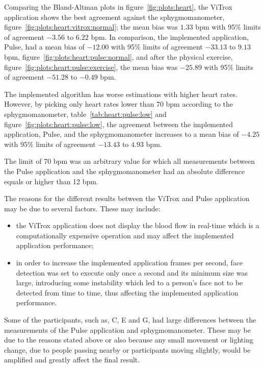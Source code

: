 \pagebreak

Comparing the Bland-Altman plots in figure~\ref{fig:plots:heart}, the ViTrox
application shows the best agreement against the sphygmomanometer,
figure~\ref{fig:plots:heart:vitrox:normal}; the mean bias was $1.33$ bpm
with 95\% limits of agreement $-3.56$ to $6.22$ bpm. In comparison,
the implemented application, Pulse, had a mean bias of $-12.00$ with
95\% limits of agreement $-33.13$ to $9.13$ bpm,
figure~\ref{fig:plots:heart:pulse:normal}, and after the physical exercise,
figure~\ref{fig:plots:heart:pulse:exercise}, the mean bias was $-25.89$
with 95\% limits of agreement $-51.28$ to $-0.49$ bpm.

The implemented algorithm has worse estimations with higher heart rates.
However, by picking only heart rates lower than 70 bpm according to the
sphygmomanometer, table~\ref{tab:heart:pulse:low} and
figure~\ref{fig:plots:heart:pulse:low}, the agreement between the
implemented application, Pulse, and the sphygmomanometer increases to
a mean bias of $-4.25$ with 95\% limits of agreement $-13.43$ to $4.93$ bpm.

The limit of 70 bpm was an arbitrary value for which all measurements
between the Pulse application and the sphygmomanometer had an absolute
difference equals or higher than 12 bpm.

The reasons for the different results between the ViTrox and Pulse application
may be due to several factors. These may include:

\begin{itemize}
  \item the ViTrox application does not display the blood flow in real-time
        which is a computationally expensive operation and may affect the
        implemented application performance;
  \item in order to increase the implemented application frames per second,
        face detection was set to execute only once a second and its minimum
        size was large, introducing some instability which led to a person's
        face not to be detected from time to time, thus affecting the
        implemented application performance.
\end{itemize}

Some of the participants, such as, C, E and G, had large differences between
the measurements of the Pulse application and sphygmomanometer. These may be
due to the reasons stated above or also because any small movement or lighting
change, due to people passing nearby or participants moving slightly,
would be amplified and greatly affect the final result.

